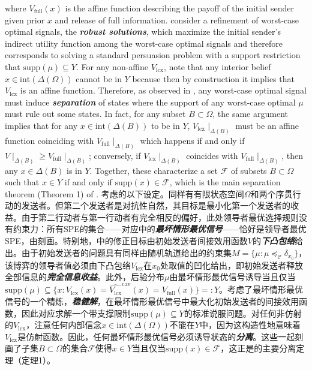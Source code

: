 \documentclass[12pt,letterpaper]{article}
\newenvironment{original}{\color{black}}{}
\newenvironment{translation}{\color{blue}}{}
\newcommand*\supp{\mathrm{supp}}
\theoremstyle{plain}
\theoremstyle{definition}
\theoremstyle{remark}
\newcommand{\C}{\mathcal{C}}
\theoremstyle{definition}
\begin{document}
\begin{original}
where $V_{\text{full}}(x)$ is the affine function describing the payoff of the initial sender given prior $x$ and release of full information. \citet{DworczakPavan2022RobustPersuasion} consider a refinement of worst-case optimal signals, the \textit{\textbf{robust solutions}}, which maximize the initial sender's indirect utility function among the worst-case optimal signals and therefore corresponds to solving a standard persuasion problem with a support restriction that $\supp(\mu) \subseteq Y$. For any non-affine $V_{\text{lcx}}$, note that any interior belief $x \in \text{int}(\Delta(\Omega))$ cannot be in $Y$ because then by construction it implies that $V_{\text{lcx}}$ is an affine function. Therefore, as observed in \citet{DworczakPavan2022RobustPersuasion}, any worst-case optimal signal must induce \textit{\textbf{separation}} of states where the support of any worst-case optimal $\mu$ must rule out some states. In fact, for any subset $B \subset \Omega$, the same argument implies that for any $x \in \text{int}(\Delta(B))$ to be in $Y$,  $V_{\text{lcx}} \mid_{\Delta(B)}$ must be an affine function coinciding with $V_{\text{full}} \mid_{\Delta(B)}$ which happens if and only if $V\mid_{\Delta(B)} \geq V_{\text{full}} \mid_{\Delta(B)}$; conversely, if $V_{\text{lcx}} \mid_{\Delta(B)}$ coincides with $V_{\text{full}} \mid_{\Delta(B)}$, then any $x \in \Delta(B)$ is in $Y$. Together, these characterize a set $\mathcal{F}$ of subsets $B \subset \Omega$ such that $x \in Y$ if and only if $\supp(x) \in \mathcal{F}$, which is the main separation theorem (Theorem 1) of \citet{DworczakPavan2022RobustPersuasion}.
\end{original}
\begin{translation}
考虑\citet{DworczakPavan2022RobustPersuasion}的以下设定。同样有有限状态空间$\Omega$和两个序贯行动的发送者。但第二个发送者是对抗性自然，其目标是最小化第一个发送者的收益。由于第二行动者与第一行动者有完全相反的偏好，此处领导者最优选择规则没有约束力：所有SPE的集合——对应\citet{DworczakPavan2022RobustPersuasion}中的\textit{\textbf{最坏情形最优信号}}——恰好是领导者最优SPE，由刻画。特别地，中的修正目标由初始发送者间接效用函数$V$的\textit{\textbf{下凸包络}}给出。由于初始发送者的问题具有同样由随机轨道给出的约束集$M = \{\mu: \mu \preceq_\C \delta_{x_0}\}$，该博弈的领导者值必须由下凸包络$V_{\text{lcx}}$在$x_0$处取值的凹化给出，即初始发送者释放全部信息的\textit{\textbf{完全信息收益}}。此外，后验分布$\mu$由最坏情形最优信号诱导当且仅当$\supp(\mu) \subseteq \{x: V_{\text{lcx}}(x) = \widehat{V_{\text{lcx}}}^{\text{cav}}(x) = V_{\text{full}}(x)\} =: Y$。\citet{DworczakPavan2022RobustPersuasion}考虑了最坏情形最优信号的一个精炼，\textit{\textbf{稳健解}}，在最坏情形最优信号中最大化初始发送者的间接效用函数，因此对应求解一个带支撑限制$\supp(\mu) \subseteq Y$的标准说服问题。对任何非仿射的$V_{\text{lcx}}$，注意任何内部信念$x \in \text{int}(\Delta(\Omega))$不能在$Y$中，因为这构造性地意味着$V_{\text{lcx}}$是仿射函数。因此，任何最坏情形最优信号必须诱导状态的\textit{\textbf{分离}}。这些一起刻画了子集$B \subset \Omega$的集合$\mathcal{F}$使得$x \in Y$当且仅当$\supp(x) \in \mathcal{F}$，这正是\citet{DworczakPavan2022RobustPersuasion}的主要分离定理（定理1）。
\end{translation}
\end{document}
